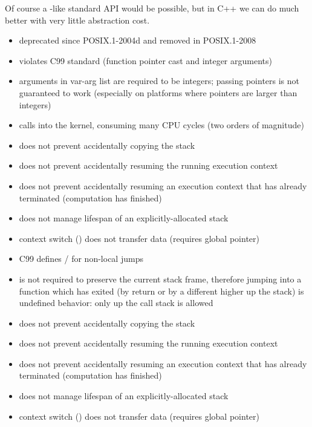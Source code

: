 Of course a \uc-like standard API would be possible, but in C++ we can do much
better with very little abstraction cost.


\begin{itemize}
    \item deprecated since POSIX.1-2004d and removed in POSIX.1-2008
    \item {} violates C99 standard (function pointer cast and integer arguments)
    \item {} arguments in var-arg list are required to be integers; passing pointers
        is not guaranteed to work (especially on platforms where pointers are larger than integers)
    \item {} calls into the kernel, consuming many CPU cycles (two orders
        of magnitude)
    \item does not prevent accidentally copying the stack
    \item does not prevent accidentally resuming the running execution
        context
    \item does not prevent accidentally resuming an execution context that has already
        terminated (computation has finished)
    \item does not manage lifespan of an explicitly-allocated stack
    \item context switch () does not transfer data (requires global pointer)
\end{itemize}


\begin{itemize}
    \item C99 defines \sj / \lj for non-local jumps
    \item \lj is not required to preserve the current stack frame, therefore jumping into a function
        which has exited (by return or by a different \lj higher up the stack) is undefined behavior:
        only \lj up the call stack is allowed
    \item does not prevent accidentally copying the stack
    \item does not prevent accidentally resuming the running execution
        context
    \item does not prevent accidentally resuming an execution context that has already
        terminated (computation has finished)
    \item does not manage lifespan of an explicitly-allocated stack
    \item context switch (\lj) does not transfer data (requires global pointer)
\end{itemize}
